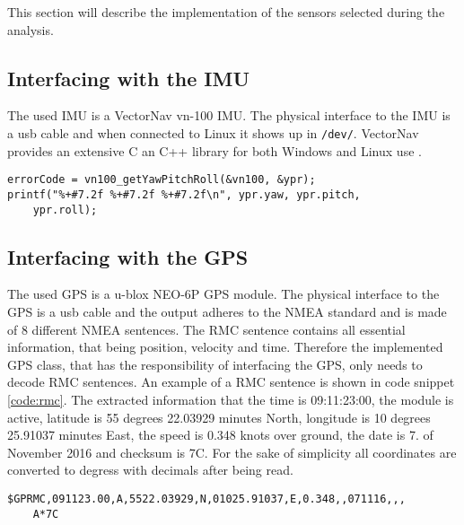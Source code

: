 \label{sub:implementation_of_sensors}
This section will describe the implementation of the sensors selected during the analysis.


\subsection{Interfacing with the IMU}\label{sec:interface_IMU}
The used IMU is a VectorNav vn-100 IMU.
The physical interface to the IMU is a usb cable and when connected to Linux it shows up in \texttt{/dev/}.
VectorNav provides an extensive C an C++ library for both Windows and Linux use \cite{vectornav}. 


\begin{lstlisting}[caption=IMU CODE......,label=code:rmc]
errorCode = vn100_getYawPitchRoll(&vn100, &ypr);
printf("%+#7.2f %+#7.2f %+#7.2f\n", ypr.yaw, ypr.pitch, 
	ypr.roll);
\end{lstlisting}

\subsection{Interfacing with the GPS}\label{sec:interface_GPS}
The used GPS is a u-blox NEO-6P GPS module.
The physical interface to the GPS is a usb cable and the output adheres to the NMEA standard and is made of 8 different NMEA sentences.
The RMC sentence contains all essential information, that being position, velocity and time.
Therefore the implemented GPS class, that has the responsibility of interfacing the GPS, only needs to decode RMC sentences.
An example of a RMC sentence is shown in code snippet \ref{code:rmc}.
The extracted information that the time is 09:11:23:00, the module is active, latitude is 55 degrees 22.03929 minutes North, longitude is 10 degrees 25.91037 minutes East, the speed is 0.348 knots over ground, the date is 7. of November 2016 and checksum is 7C.
For the sake of simplicity all coordinates are converted to degress with decimals after being read. 
\begin{lstlisting}[caption=RMC sentence.,label=code:rmc]
$GPRMC,091123.00,A,5522.03929,N,01025.91037,E,0.348,,071116,,,
	A*7C
\end{lstlisting}

